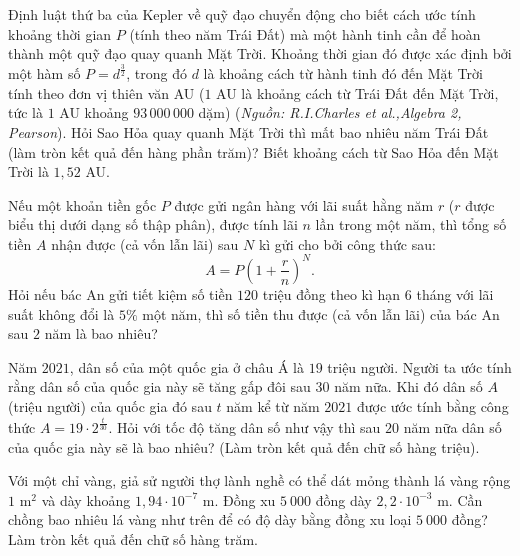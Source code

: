 \begin{bt}%
	Định luật thứ ba của Kepler về quỹ đạo chuyển động cho biết cách ước tính khoảng thời gian $P$ (tính theo năm Trái Đất) mà một hành tinh cần để hoàn thành một quỹ đạo quay quanh Mặt Trời. Khoảng thời gian đó được xác định bởi một hàm số $P=d^{\frac{3}{2}}$, trong đó $d$ là khoảng cách từ hành tinh đó đến Mặt Trời tính theo đơn vị thiên văn AU ($1$ AU là khoảng cách từ Trái Đất đến Mặt Trời, tức là $1$ AU khoảng $93\,000\,000$ dặm) (\textit{Nguồn: R.I.Charles et al.,Algebra 2, Pearson}). Hỏi Sao Hỏa quay quanh Mặt Trời thì mất bao nhiêu năm Trái Đất (làm tròn kết quả đến hàng phần trăm)? Biết khoảng cách từ Sao Hỏa đến Mặt Trời là $1{,}52$ AU.
\end{bt}
\begin{bt}%
	Nếu một khoản tiền gốc $P$ được gửi ngân hàng với lãi suất hằng năm $r$ ($r$ được biểu thị dưới dạng số thập phân), được tính lãi $n$ lần trong một năm, thì tổng số tiền $A$ nhận được (cả vốn lẫn lãi) sau $N$ kì gửi cho bởi công thức sau:
	$$
	A=P\left(1+\dfrac{r}{n}\right)^N .
	$$
	Hỏi nếu bác An gửi tiết kiệm số tiền $120$ triệu đồng theo kì hạn $6$ tháng với lãi suất không đổi là $5 \%$ một năm, thì số tiền thu được (cả vốn lẫn lãi) của bác An sau $2$ năm là bao nhiêu?
\end{bt}
\begin{bt}%
	Năm $2021$, dân số của một quốc gia ở châu Á là $19$ triệu người. Người ta ước tính rằng dân số của quốc gia này sẽ tăng gấp đôi sau $30$ năm nữa. Khi đó dân số $A$ (triệu người) của quốc gia đó sau $t$ năm kể từ năm $2021$ được ước tính bằng công thức $A=19 \cdot 2^{\tfrac{t}{30}}$. Hỏi với tốc độ tăng dân số như vậy thì sau $20$ năm nữa dân số của quốc gia này sẽ là bao nhiêu? (Làm tròn kết quả đến chữ số hàng triệu).
\end{bt}
\begin{bt}%
	Với một chỉ vàng, giả sử người thợ lành nghề có thể dát mỏng thành lá vàng rộng $1$ m$^2$ và dày khoảng $1{,}94 \cdot 10^{-7}$ m. Đồng xu $5\ 000$ đồng dày $2{,}2 \cdot 10^{-3}$ m. Cần chồng bao nhiêu lá vàng như trên để có độ dày bằng đồng xu loại $5\ 000$ đồng? Làm tròn kết quả đến chữ số hàng trăm.
\end{bt}
